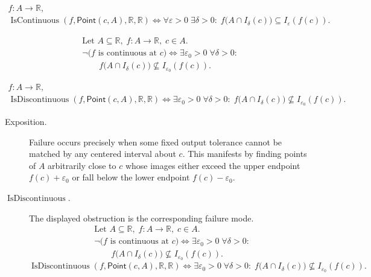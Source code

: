 \begin{remark*}
\[
\begin{aligned}
  f\colon A\to\mathbb{R},\\
\operatorname{IsContinuous}(f,\mathsf{Point}(c,A),\mathbb R,\mathbb R)
\Longleftrightarrow
\forall \varepsilon > 0\; \exists \delta > 0:\;
f\bigl(A \cap I_\delta(c)\bigr) \subseteq I_\varepsilon(f(c)).
\end{aligned}
\]
\end{remark*}

\begin{remark*}
\[
\begin{aligned}
&\text{Let } A \subseteq \mathbb{R},\; f:A \to \mathbb{R},\; c \in A.\\
&\neg\bigl(f \text{ is continuous at } c\bigr) \Longleftrightarrow \exists \varepsilon_{0} > 0\; \forall \delta > 0:\\
&\qquad f\bigl(A \cap I_\delta(c)\bigr) \nsubseteq I_{\varepsilon_0}(f(c)).
\end{aligned}
\]
\end{remark*}

\begin{remark*}
\[
\begin{aligned}
  f\colon A\to\mathbb{R},\\
\operatorname{IsDiscontinuous}(f,\mathsf{Point}(c,A),\mathbb R,\mathbb R)
\Longleftrightarrow
\exists \varepsilon_{0} > 0\; \forall \delta > 0:\;
f\bigl(A \cap I_\delta(c)\bigr) \nsubseteq I_{\varepsilon_0}(f(c)).
\end{aligned}
\]
\end{remark*}

\begin{remark*}
\begin{description}
  \item[Exposition.]
Failure occurs precisely when some fixed output tolerance cannot be matched by any centered interval about $c$. This manifests by finding points of $A$ arbitrarily close to $c$ whose images either exceed the upper endpoint $f(c)+\varepsilon_{0}$ or fall below the lower endpoint $f(c)-\varepsilon_{0}$.


  \item[\(\operatorname{IsDiscontinuous}.\)]
  The displayed obstruction is the corresponding failure mode.
  \[
\begin{aligned}
&\text{Let } A \subseteq \mathbb{R},\; f:A \to \mathbb{R},\; c \in A.\\
&\neg\bigl(f \text{ is continuous at } c\bigr) \Longleftrightarrow \exists \varepsilon_{0} > 0\; \forall \delta > 0:\\
&\qquad f\bigl(A \cap I_\delta(c)\bigr) \nsubseteq I_{\varepsilon_0}(f(c)).
\end{aligned}
  \]
  \[
\operatorname{IsDiscontinuous}(f,\mathsf{Point}(c,A),\mathbb R,\mathbb R)
\Longleftrightarrow
\exists \varepsilon_{0} > 0\; \forall \delta > 0:\;
f\bigl(A \cap I_\delta(c)\bigr) \nsubseteq I_{\varepsilon_0}(f(c)).
  \]
\end{description}
\end{remark*}


